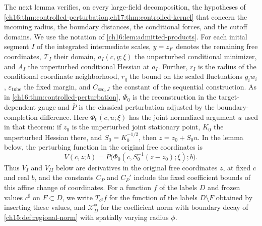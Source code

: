 The next lemma verifies, on every large-field decomposition, the hypotheses of \cref{ch16:thm:controlled-perturbation,ch17:thm:controlled-kernel} that concern the incoming radius, the boundary distances, the conditional forces, and the cutoff domains. We use the notation of \cref{ch16:lem:admitted-products}. For each initial segment $I$ of the integrated intermediate scales, $y=z_{I^c}$ denotes the remaining free coordinates, $\mathcal T_I$ their domain, $a_I(c,y;\xi)$ the unperturbed conditional minimizer, and $A_I$ the unperturbed conditional Hessian at $a_I$. Further, $r_I$ is the radius of the conditional coordinate neighborhood, $r_q$ the bound on the scaled fluctuations $g_iw_i$, $\varepsilon_{\mathrm{tube}}$ the fixed margin, and $C_{\mathrm{seq},J}$ the constant of the sequential construction. As in \cref{ch16:thm:controlled-perturbation}, $\Phi_0$ is the reconstruction in the target-dependent gauge and $\overline P$ is the classical perturbation adjusted by the boundary-completion difference. Here $\Phi_0(c,u;\xi)$ has the joint normalized argument $u$ used in that theorem: if $z_0$ is the unperturbed joint stationary point, $K_0$ the unperturbed Hessian there, and $S_0=K_0^{-1/2}$, then $z=z_0+S_0u$. In the lemma below, the perturbing function in the original free coordinates is
\begin{equation}\label{ch18:eq:force-function}
 V(c,z;b)=\overline P\bigl(\Phi_0(c,S_0^{-1}(z-z_0);\xi);b\bigr).
\end{equation}
Thus $V_I$ and $V_{II}$ below are derivatives in the original free coordinates $z$, at fixed $c$ and real $b$, and the constants $C_P$ and $C_P'$ include the fixed coefficient bounds of this affine change of coordinates. For a function $f$ of the labels $D$ and frozen values $c^\sharp$ on $F\subset D$, we write $T_{c^\sharp}f$ for the function of the labels $D\setminus F$ obtained by inserting these values, and $\mathcal X_D^{\phi}$ for the coefficient norm with boundary decay of \cref{ch15:def:regional-norm} with spatially varying radius $\phi$.

